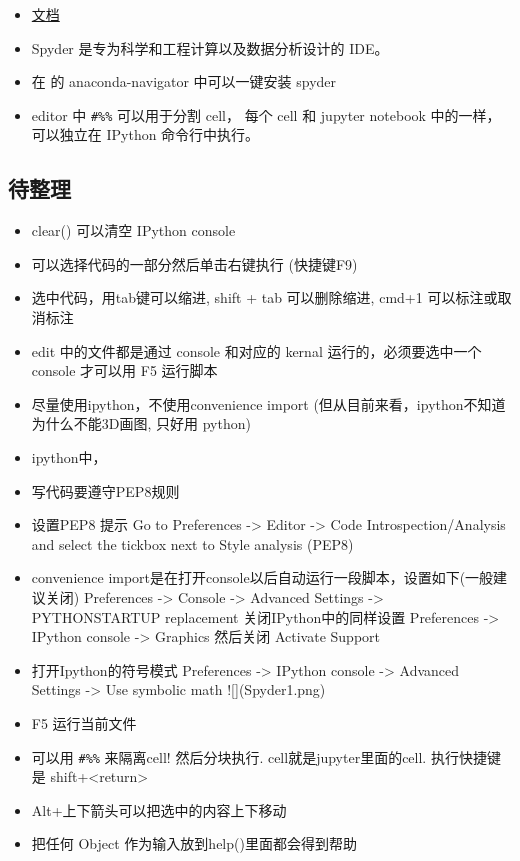 
\begin{issues}
\issueDraft
\end{issues}

\begin{itemize}
\item \href{https://docs.spyder-ide.org/current/}{文档}
\item Spyder 是专为科学和工程计算以及数据分析设计的 IDE。
\item 在  的 anaconda-navigator 中可以一键安装 spyder
\item editor 中 \verb|#%%| 可以用于分割 cell， 每个 cell 和 jupyter notebook 中的一样， 可以独立在 IPython 命令行中执行。
\end{itemize}

\subsection{待整理}
\begin{itemize}
\item clear() 可以清空 IPython console
\item 可以选择代码的一部分然后单击右键执行 (快捷键F9)
\item 选中代码，用tab键可以缩进, shift + tab 可以删除缩进, cmd+1 可以标注或取消标注
\item edit 中的文件都是通过 console 和对应的 kernal 运行的，必须要选中一个 console 才可以用 F5 运行脚本
\item 尽量使用ipython，不使用convenience import (但从目前来看，ipython不知道为什么不能3D画图, 只好用 python)
\item ipython中，%
\item 写代码要遵守PEP8规则
\item 设置PEP8 提示
  Go to Preferences -> Editor -> Code Introspection/Analysis and select the tickbox next to Style analysis (PEP8)
\item convenience import是在打开console以后自动运行一段脚本，设置如下(一般建议关闭)
   Preferences -> Console -> Advanced Settings -> PYTHONSTARTUP replacement
   关闭IPython中的同样设置
   Preferences -> IPython console -> Graphics 然后关闭 Activate Support
\item 打开Ipython的符号模式
   Preferences -> IPython console -> Advanced Settings -> Use symbolic math
![](Spyder1.png)

\item F5 运行当前文件
\item 可以用 \verb|#%%| 来隔离cell! 然后分块执行. cell就是jupyter里面的cell. 执行快捷键是 shift+<return>
\item Alt+上下箭头可以把选中的内容上下移动
\item 把任何 Object 作为输入放到help()里面都会得到帮助
\end{itemize}
